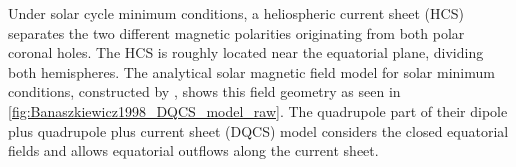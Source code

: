 Under solar cycle minimum conditions, a heliospheric current sheet (HCS) separates the two different magnetic polarities originating from both polar coronal holes. The HCS is roughly located near the equatorial plane, dividing both hemispheres. The analytical solar magnetic field model for solar minimum conditions, constructed by \citet{Banaszkiewicz1998}, shows this field geometry as seen in \autoref{fig:Banaszkiewicz1998_DQCS_model_raw}. The quadrupole part of their dipole plus quadrupole plus current sheet (DQCS) model considers the closed equatorial fields and allows equatorial outflows along the current sheet.
\begin{figure}[htb]
	\begin{floatrow}
		\ffigbox{
}
\end{floatrow}
\end{figure}
